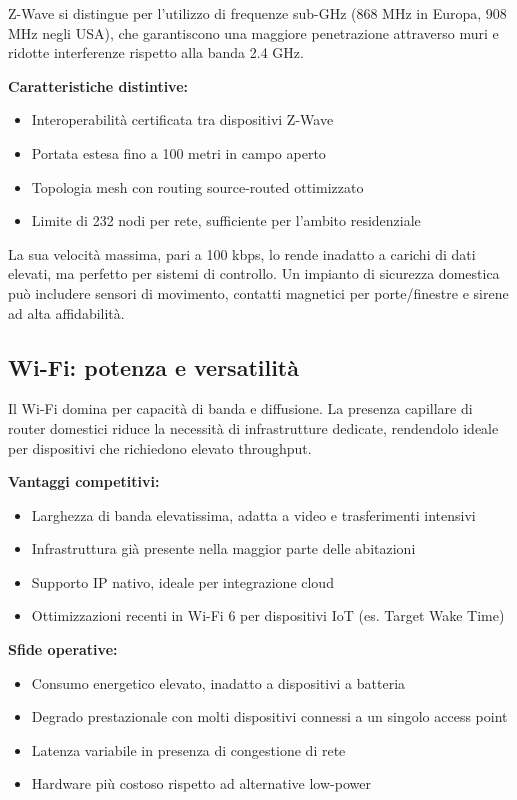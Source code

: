 Z-Wave si distingue per l’utilizzo di frequenze sub-GHz (868 MHz in Europa, 908 MHz negli USA), che garantiscono una maggiore penetrazione attraverso muri e ridotte interferenze rispetto alla banda 2.4 GHz.

\textbf{Caratteristiche distintive:}
\begin{itemize}
    \item Interoperabilità certificata tra dispositivi Z-Wave
    \item Portata estesa fino a 100 metri in campo aperto
    \item Topologia mesh con routing source-routed ottimizzato
    \item Limite di 232 nodi per rete, sufficiente per l’ambito residenziale
\end{itemize}

La sua velocità massima, pari a 100 kbps, lo rende inadatto a carichi di dati elevati, ma perfetto per sistemi di controllo. Un impianto di sicurezza domestica può includere sensori di movimento, contatti magnetici per porte/finestre e sirene ad alta affidabilità.

\subsection{Wi-Fi: potenza e versatilità}

Il Wi-Fi domina per capacità di banda e diffusione. La presenza capillare di router domestici riduce la necessità di infrastrutture dedicate, rendendolo ideale per dispositivi che richiedono elevato throughput.

\textbf{Vantaggi competitivi:}
\begin{itemize}
    \item Larghezza di banda elevatissima, adatta a video e trasferimenti intensivi
    \item Infrastruttura già presente nella maggior parte delle abitazioni
    \item Supporto IP nativo, ideale per integrazione cloud
    \item Ottimizzazioni recenti in Wi-Fi 6 per dispositivi IoT (es. Target Wake Time)
\end{itemize}

\textbf{Sfide operative:}
\begin{itemize}
    \item Consumo energetico elevato, inadatto a dispositivi a batteria
    \item Degrado prestazionale con molti dispositivi connessi a un singolo access point
    \item Latenza variabile in presenza di congestione di rete
    \item Hardware più costoso rispetto ad alternative low-power
\end{itemize}

